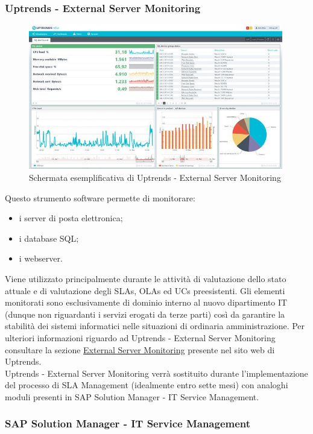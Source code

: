 \subsubsection{Uptrends - External Server Monitoring}

\begin{figure}[H]
\centering
\includegraphics[width=30em]{immagini/sla/servermonitor.png}
\caption{Schermata esemplificativa di Uptrends - External Server Monitoring}
\end{figure}

Questo strumento software permette di monitorare:

\begin{itemize}
	\item i server di posta elettronica;
    \item i database SQL;
    \item i webserver.
\end{itemize}

Viene utilizzato principalmente durante le attività di valutazione dello stato attuale e di valutazione degli SLAs, OLAs ed UCs preesistenti. Gli elementi monitorati sono esclusivamente di dominio interno al nuovo dipartimento IT (dunque non riguardanti i servizi erogati da terze parti) così da garantire la stabilità dei sistemi informatici nelle situazioni di ordinaria amministrazione. Per ulteriori informazioni riguardo ad Uptrends - External Server Monitoring consultare la sezione \href{https://www.uptrends.com/products/external-server-monitoring}{External Server Monitoring} presente nel sito web di Uptrends.
\\
Uptrends - External Server Monitoring verrà sostituito durante l'implementazione del processo di SLA Management (idealmente entro sette mesi) con analoghi moduli presenti in SAP Solution Manager - IT Service Management.

\subsubsection{SAP Solution Manager - IT Service Management}


